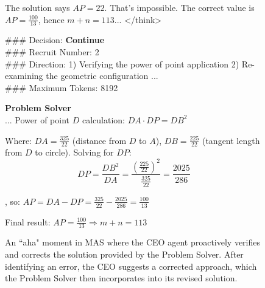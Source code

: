 \begin{figure}[t]
\begin{tcolorbox}
\begin{tcolorbox}[
  enhanced,
  colback=white,
  colframe=orange,
  boxrule=0.5pt,
  sharp corners,
  left=1pt, right=1pt, top=1pt, bottom=1pt
]
The solution says \(AP = 22\). That's impossible. The correct value is \(AP = \frac{100}{13}\), hence \(m+n = \boxed{113}\)... \textless/think\textgreater

\#\#\# Decision: \textbf{Continue} \\
\#\#\# Recruit Number: 2 \\
\#\#\# Direction: 1) Verifying the power of point application 2) Re-examining the geometric configuration ... \\
\#\#\# Maximum Tokens: 8192
\end{tcolorbox}

\begin{tcolorbox}[
  enhanced,
  colback=white,
  colframe=olivegreen,
  boxrule=0.5pt,
  sharp corners,
  left=1pt, right=1pt, top=1pt, bottom=1pt
]
\textcolor{olivegreen}{\textbf{Problem Solver}} \\
... Power of point \( D \) calculation: $DA \cdot DP = DB^2$

Where: \( DA = \frac{325}{22} \) (distance from \( D \) to \( A \)), \( DB = \frac{225}{22} \) (tangent length from \( D \) to circle). Solving for \( DP \):
\[
DP = \frac{DB^2}{DA} = \frac{\left(\frac{225}{22}\right)^2}{\frac{325}{22}} = \frac{2025}{286}
\]

, so: $AP = DA - DP = \frac{325}{22} - \frac{2025}{286} = \frac{100}{13}$

Final result: $AP = \frac{100}{13} \Rightarrow m + n = \boxed{113}$
\end{tcolorbox}
\end{tcolorbox}
\caption{An ``aha" moment in MAS where the CEO agent proactively verifies and corrects the solution provided by the Problem Solver. After identifying an error, the CEO suggests a corrected approach, which the Problem Solver then incorporates into its revised solution.}
\label{fig:aha_moment}
\end{figure}


